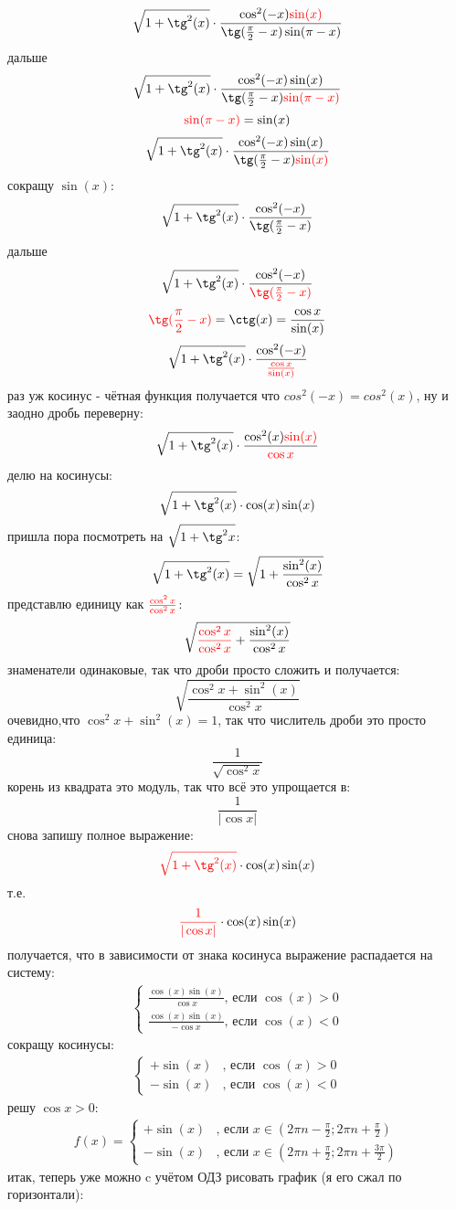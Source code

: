 \documentclass{article}
\begin{document}
$$\sqrt{1+\tg^2(x)}\cdot\frac{\cos^2(-x){\color{red}\sin(x)}}{\tg(\frac{\pi}{2}-x)\sin(\pi-x)}$$
дальше
$$\sqrt{1+\tg^2(x)}\cdot\frac{\cos^2(-x)\sin(x)}{\tg(\frac{\pi}{2}-x){\color{red}\sin(\pi-x)}}$$
$${\color{red}\sin(\pi-x)}=\sin(x)$$
$$\sqrt{1+\tg^2(x)}\cdot\frac{\cos^2(-x)\sin(x)}{\tg(\frac{\pi}{2}-x){\color{red}\sin(x)}}$$
сокращу $\sin(x)$:
$$\sqrt{1+\tg^2(x)}\cdot\frac{\cos^2(-x)}{\tg(\frac{\pi}{2}-x)}$$
дальше
$$\sqrt{1+\tg^2(x)}\cdot\frac{\cos^2(-x)}{\color{red}\tg(\frac{\pi}{2}-x)}$$
$${\color{red}\tg(\frac{\pi}{2}-x)}=\ctg(x)=\frac{\cos{x}}{\sin(x)}$$
$$\sqrt{1+\tg^2(x)}\cdot\frac{\cos^2(-x)}{\color{red}\frac{\cos{x}}{\sin(x)}}$$
раз уж косинус - чётная функция получается что $cos^2{(-x)}=cos^2{(x)}$, ну и заодно дробь переверну:
$$\sqrt{1+\tg^2(x)}\cdot\frac{\cos^2(x){\color{red}\sin(x)}}{\color{red}\cos{x}}$$
делю на косинусы:
$$\sqrt{1+\tg^2(x)}\cdot\cos(x)\sin(x)$$
пришла пора посмотреть на $\sqrt{1+\tg^2{x}}$:
$$\sqrt{1+\tg^2(x)}=\sqrt{1+\frac{\sin^2(x)}{\cos^2{x}}}$$
представлю единицу как $\color{red}\frac{\cos^2{x}}{\cos^2{x}}$:
$$\sqrt{{\color{red}\frac{\cos^2{x}}{\cos^2{x}} }+\frac{\sin^2(x)}{\cos^2{x}}}$$
знаменатели одинаковые, так что дроби просто сложить и получается:
$$\sqrt{\frac{\cos^2{x}+\sin^2(x)}{\cos^2{x}}}$$
очевидно,что $\cos^2{x}+\sin^2(x)=1$, так что числитель дроби это просто единица:
$$\frac{1}{\sqrt{\cos^2{x}}}$$
корень из квадрата это модуль, так что всё это упрощается в:
$$\frac{1}{|\cos{x}|}$$
снова запишу полное выражение:
$${\color{red}\sqrt{1+\tg^2(x)} }\cdot\cos(x)\sin(x)$$
т.е.
$${\color{red}\frac{1}{|\cos{x}|} }\cdot\cos(x)\sin(x)$$
получается, что в зависимости от знака косинуса выражение распадается на систему:
\begin{align}
    \begin{cases}
    \frac{\cos(x)\sin(x)}{\cos{x}}\textrm{, если }\cos(x)>0\\
    \frac{\cos(x)\sin(x)}{-\cos{x}}\textrm{, если }\cos(x)<0
    \end{cases}
\end{align}
сокращу косинусы:
\begin{align}
    \begin{cases}
    +\sin(x)&\textrm{, если }\cos(x)>0\\
    -\sin(x)&\textrm{, если }\cos(x)<0
    \end{cases}
\end{align}
решу $\cos{x}>0$:
\begin{align}
    f(x)=\begin{cases}
    +\sin(x) & \textrm{, если }x\in(2\pi{}n-\frac{\pi}{2};2\pi{}n+\frac{\pi}{2})\\
    -\sin(x) & \textrm{, если }x\in(2\pi{}n+\frac{\pi}{2};2\pi{}n+\frac{3\pi}{2})
    \end{cases}
\end{align}
итак, теперь уже можно c учётом ОДЗ рисовать график (я его сжал по горизонтали):
\end{document}
